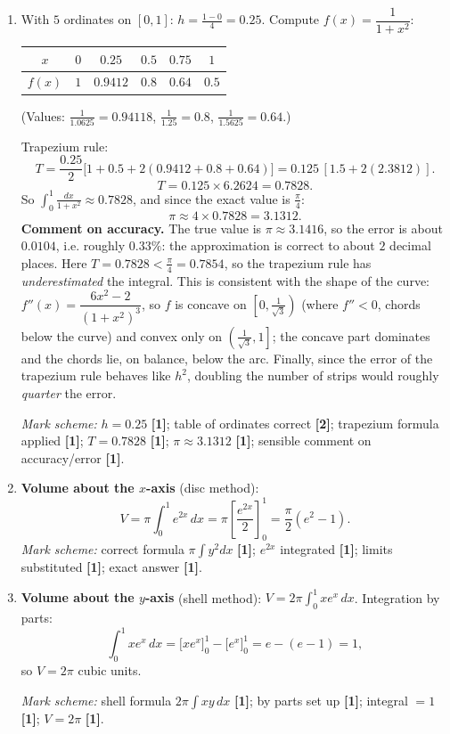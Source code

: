\documentclass[11pt]{article}
\begin{document}
\begin{corrige}
\begin{enumerate}
\item With $5$ ordinates on $[0,1]$: $h = \frac{1-0}{4} = 0.25$. Compute $f(x) = \dfrac{1}{1+x^2}$:
\begin{center}
\begin{tabular}{|c|ccccc|}
\hline
\rowcolor{popblueL} $x$ & $0$ & $0.25$ & $0.5$ & $0.75$ & $1$ \\
\hline
$f(x)$ & $1$ & $0.9412$ & $0.8$ & $0.64$ & $0.5$ \\
\hline
\end{tabular}
\end{center}
(Values: $\frac{1}{1.0625} = 0.94118$, $\frac{1}{1.25} = 0.8$, $\frac{1}{1.5625} = 0.64$.)

Trapezium rule:
\[
T = \frac{0.25}{2}\Big[1 + 0.5 + 2(0.9412 + 0.8 + 0.64)\Big] = 0.125\,[1.5 + 2(2.3812)].
\]
\[
T = 0.125 \times 6.2624 = 0.7828.
\]
So $\displaystyle\int_0^1\frac{dx}{1+x^2} \approx 0.7828$, and since the exact value is $\frac{\pi}{4}$:
\[
\pi \approx 4 \times 0.7828 = \boxed{3.1312}.
\]
\textbf{Comment on accuracy.} The true value is $\pi \approx 3.1416$, so the error is about $0.0104$, i.e. roughly $0.33\%$: the approximation is correct to about $2$ decimal places. Here $T = 0.7828 < \frac{\pi}{4} = 0.7854$, so the trapezium rule has \emph{underestimated} the integral. This is consistent with the shape of the curve: $f''(x) = \dfrac{6x^2 - 2}{(1+x^2)^3}$, so $f$ is concave on $\left[0, \frac{1}{\sqrt3}\right)$ (where $f'' < 0$, chords below the curve) and convex only on $\left(\frac{1}{\sqrt3}, 1\right]$; the concave part dominates and the chords lie, on balance, below the arc. Finally, since the error of the trapezium rule behaves like $h^2$, doubling the number of strips would roughly \emph{quarter} the error.

\textit{Mark scheme:} $h = 0.25$ \textbf{[1]}; table of ordinates correct \textbf{[2]}; trapezium formula applied \textbf{[1]}; $T = 0.7828$ \textbf{[1]}; $\pi \approx 3.1312$ \textbf{[1]}; sensible comment on accuracy/error \textbf{[1]}.

\item \textbf{Volume about the $x$-axis} (disc method):
\[
V = \pi\int_0^1 e^{2x}\,dx = \pi\left[\frac{e^{2x}}{2}\right]_0^1 = \boxed{\frac{\pi}{2}\left(e^2 - 1\right)}.
\]
\textit{Mark scheme:} correct formula $\pi\int y^2 dx$ \textbf{[1]}; $e^{2x}$ integrated \textbf{[1]}; limits substituted \textbf{[1]}; exact answer \textbf{[1]}.

\item \textbf{Volume about the $y$-axis} (shell method): $V = 2\pi\displaystyle\int_0^1 x e^x\,dx$. Integration by parts:
\[
\int_0^1 x e^x\,dx = \Big[xe^x\Big]_0^1 - \Big[e^x\Big]_0^1 = e - (e-1) = 1,
\]
so $\boxed{V = 2\pi}$ cubic units.

\textit{Mark scheme:} shell formula $2\pi\int xy\,dx$ \textbf{[1]}; by parts set up \textbf{[1]}; integral $=1$ \textbf{[1]}; $V = 2\pi$ \textbf{[1]}.
\end{enumerate}
\end{corrige}
\end{document}
